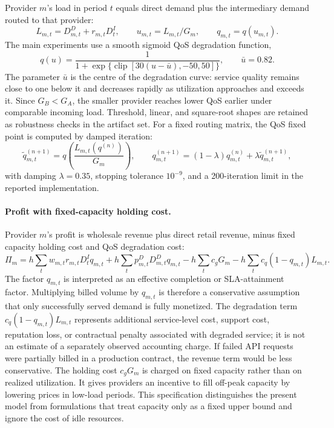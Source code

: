 \documentclass[11pt,a4paper]{article}
\newcommand{\qos}{q}
\newcommand{\D}{D}
\begin{document}
Provider $m$'s load in period $t$ equals direct demand plus the intermediary demand routed to that provider:
\begin{equation}
  L_{m,t}=\D^D_{m,t}+r_{m,t}\D^I_t,
  \qquad
  u_{m,t}=L_{m,t}/G_m,
  \qquad
  q_{m,t}=\qos(u_{m,t}).
  \label{eq:load}
\end{equation}
The main experiments use a smooth sigmoid QoS degradation function,
\begin{equation}
  \qos(u)=
  \frac{1}{1+\exp\{\operatorname{clip}[30(u-\bar u),-50,50]\}},
  \qquad \bar u=0.82 .
  \label{eq:qos_function}
\end{equation}
The parameter $\bar u$ is the centre of the degradation curve: service quality remains close to one below it and decreases rapidly as utilization approaches and exceeds it. Since $G_B<G_A$, the smaller provider reaches lower QoS earlier under comparable incoming load. Threshold, linear, and square-root shapes are retained as robustness checks in the artifact set. For a fixed routing matrix, the QoS fixed point is computed by damped iteration:
\begin{equation}
  \tilde q^{(n+1)}_{m,t}
  =\qos\!\left(\frac{L_{m,t}(q^{(n)})}{G_m}\right),
  \qquad
  q^{(n+1)}_{m,t}
  =(1-\lambda)q^{(n)}_{m,t}+\lambda \tilde q^{(n+1)}_{m,t},
  \label{eq:qos_fixed_point}
\end{equation}
with damping $\lambda=0.35$, stopping tolerance $10^{-9}$, and a 200-iteration limit in the reported implementation.

\paragraph{Profit with fixed-capacity holding cost.}

Provider $m$'s profit is wholesale revenue plus direct retail revenue, minus fixed capacity holding cost and QoS degradation cost:
\begin{equation}
  \Pi_m=h\!\sum_t\! w_{m,t}r_{m,t}\D^I_t q_{m,t}
  +h\!\sum_t\! p^D_{m,t}\D^D_{m,t}q_{m,t}
  -h\!\sum_t\! c_g G_m
  -h\!\sum_t\! c_q(1-q_{m,t})L_{m,t}.
  \label{eq:firm_profit}
\end{equation}
The factor $q_{m,t}$ is interpreted as an effective completion or SLA-attainment factor. Multiplying billed volume by $q_{m,t}$ is therefore a conservative assumption that only successfully served demand is fully monetized. The degradation term $c_q(1-q_{m,t})L_{m,t}$ represents additional service-level cost, support cost, reputation loss, or contractual penalty associated with degraded service; it is not an estimate of a separately observed accounting charge. If failed API requests were partially billed in a production contract, the revenue term would be less conservative. The holding cost $c_gG_m$ is charged on fixed capacity rather than on realized utilization. It gives providers an incentive to fill off-peak capacity by lowering prices in low-load periods. This specification distinguishes the present model from formulations that treat capacity only as a fixed upper bound and ignore the cost of idle resources.
\end{document}
